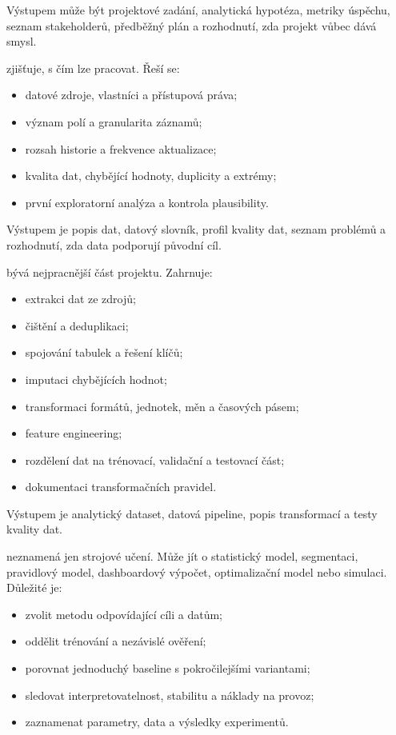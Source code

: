 Výstupem může být projektové zadání, analytická hypotéza, metriky úspěchu, seznam stakeholderů, předběžný plán a rozhodnutí, zda projekt vůbec dává smysl.

 zjišťuje, s čím lze pracovat. Řeší se:
\begin{itemize}
  \item datové zdroje, vlastníci a přístupová práva;
  \item význam polí a granularita záznamů;
  \item rozsah historie a frekvence aktualizace;
  \item kvalita dat, chybějící hodnoty, duplicity a extrémy;
  \item první exploratorní analýza a kontrola plausibility.
\end{itemize}

Výstupem je popis dat, datový slovník, profil kvality dat, seznam problémů a rozhodnutí, zda data podporují původní cíl.

 bývá nejpracnější část projektu. Zahrnuje:
\begin{itemize}
  \item extrakci dat ze zdrojů;
  \item čištění a deduplikaci;
  \item spojování tabulek a řešení klíčů;
  \item imputaci chybějících hodnot;
  \item transformaci formátů, jednotek, měn a časových pásem;
  \item feature engineering;
  \item rozdělení dat na trénovací, validační a testovací část;
  \item dokumentaci transformačních pravidel.
\end{itemize}

Výstupem je analytický dataset, datová pipeline, popis transformací a testy kvality dat.

 neznamená jen strojové učení. Může jít o statistický model, segmentaci, pravidlový model, dashboardový výpočet, optimalizační model nebo simulaci. Důležité je:
\begin{itemize}
  \item zvolit metodu odpovídající cíli a datům;
  \item oddělit trénování a nezávislé ověření;
  \item porovnat jednoduchý baseline s pokročilejšími variantami;
  \item sledovat interpretovatelnost, stabilitu a náklady na provoz;
  \item zaznamenat parametry, data a výsledky experimentů.
\end{itemize}

